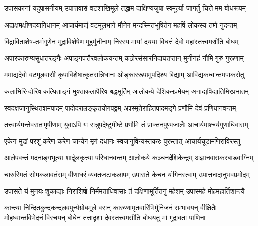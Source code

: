 

\begin{AutoCols}[\maxColumns]
\fourlineindentedshloka
{उपासकानां यदुपासनीयम्}
{उपात्तवासं वटशाखिमूले}
{तद्धाम दाक्षिण्यजुषा स्वमूर्त्या}
{जागर्तु चित्ते मम बोधरूपम्}

\fourlineindentedshloka
{अद्राक्षमक्षीणदयानिधानम्}
{आचार्यमाद्यं वटमूलभागे}
{मौनेन मन्दस्मितभूषितेन}
{महर्षि लोकस्य तमो नुदन्तम्}

\fourlineindentedshloka
{विद्राविताशेष-तमोगुणेन}
{मुद्राविशेषेण मुहुर्मुनीनाम्}
{निरस्य मायां दयया विधत्ते}
{देवो महांस्तत्त्वमसीति बोधम्}

\fourlineindentedshloka
{अपारकारुण्यसुधातरङ्गैः}
{अपाङ्गपातैरवलोकयन्तम्}
{कठोरसंसारनिदाघतप्तान्}
{मुनीनहं नौमि गुरुं गुरूणाम्}

\fourlineindentedshloka
{ममाद्यदेवो वटमूलवासी}
{कृपाविशेषात्कृतसन्निधानः}
{ओङ्काररूपामुपदिश्य विद्याम्}
{आविद्यकध्वान्तमपाकरोतु}

\fourlineindentedshloka
{कलाभिरिन्दोरिव कल्पिताङ्गं}
{मुक्ताकलापैरिव बद्धमूर्तिम्}
{आलोकये देशिकमप्रमेयम्}
{अनाद्यविद्यातिमिरप्रभातम्}

\fourlineindentedshloka
{स्वदक्षजानुस्थितवामपादम्}
{पादोदरालङ्कृतयोगपट्टम्}
{अपस्मृतेराहितपादमङ्गे}
{प्रणौमि देवं प्रणिधानवन्तम्}

\fourlineindentedshloka
{तत्त्वार्थमन्तेवसतामृषीणाम्}
{युवाऽपि यः सन्नुपदेष्टुमीष्टे}
{प्रणौमि तं प्राक्तनपुण्यजालैः}
{आचार्यमाश्चर्यगुणाधिवासम्}

\fourlineindentedshloka
{एकेन मुद्रां परशुं करेण}
{करेण चान्येन मृगं दधानः}
{स्वजानुविन्यस्तकरः पुरस्तात्}
{आचार्यचूडामणिराविरस्तु}

\fourlineindentedshloka
{आलेपवन्तं मदनाङ्गभूत्या}
{शार्दूलकृत्त्या परिधानवन्तम्}
{आलोकये कञ्चनदेशिकेन्द्रम्}
{अज्ञानवाराकरबाडवाग्निम्}

\fourlineindentedshloka
{चारुस्मितं सोमकलावतंसम्}
{वीणाधरं व्यक्तजटाकलापम्}
{उपासते केचन योगिनस्त्वाम्}
{उपात्तनादानुभवप्रमोदम्}

\fourlineindentedshloka
{उपासते यं मुनयः शुकाद्याः}
{निराशिषो निर्ममताधिवासाः}
{तं दक्षिणामूर्तितनुं महेशम्}
{उपास्महे मोहमहार्तिशान्त्यै}
\end{AutoCols}

\fourlineindentedshloka
{कान्त्या निन्दितकुन्दकन्दलवपुर्न्यग्रोधमूले वसन्}
{कारुण्यामृतवारिभिर्मुनिजनं सम्भावयन् वीक्षितैः}
{मोहध्वान्तविभेदनं विरचयन् बोधेन तत्तादृशा}
{देवस्तत्त्वमसीति बोधयतु मां मुद्रावता पाणिना}

